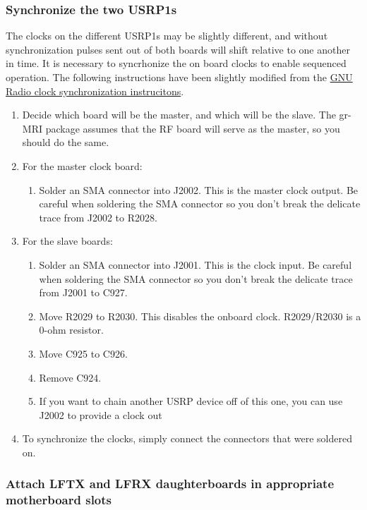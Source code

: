 \documentclass[11pt, oneside]{article}   	%
\begin{document}
\subsubsection{Synchronize the two USRP1s}

\indent The clocks on the different USRP1s may be slightly different, and without synchronization pulses sent out of both boards will shift relative to one another in time.  It is necessary to syncrhonize the on board clocks to enable sequenced operation.  The following instructions have been slightly modified from the 
\color{blue}
\href{https://gnuradio.org/redmine/projects/gnuradio/wiki/USRPClockingNotes\#Synchronizing-multiple-USRP1s}{GNU Radio clock synchronization instrucitons}.
\color{black}

\begin{enumerate}
	\item Decide which board will be the master, and which will be the slave.  The gr-MRI package assumes that the RF board will serve as the master, so you should do the same.
	\item For the master clock board:
	\begin{enumerate}
		\item Solder an SMA connector into J2002. This is the master clock output. Be careful when soldering the SMA connector so you don't break the delicate trace from J2002 to R2028.
	\end{enumerate}
	\item For the slave boards:
	\begin{enumerate}
		\item Solder an SMA connector into J2001. This is the clock input. Be careful when soldering the SMA connector so you don't break the delicate trace from J2001 to C927.
		\item Move R2029 to R2030. This disables the onboard clock. R2029/R2030 is a 0-ohm resistor.
		\item Move C925 to C926.
		\item Remove C924.
		\item If you want to chain another USRP device off of this one, you can use J2002 to provide a clock out
	\end{enumerate}
	\item To synchronize the clocks, simply connect the connectors that were soldered on.
\end{enumerate}



\subsubsection{Attach LFTX and LFRX daughterboards in appropriate motherboard slots}
\end{document}
